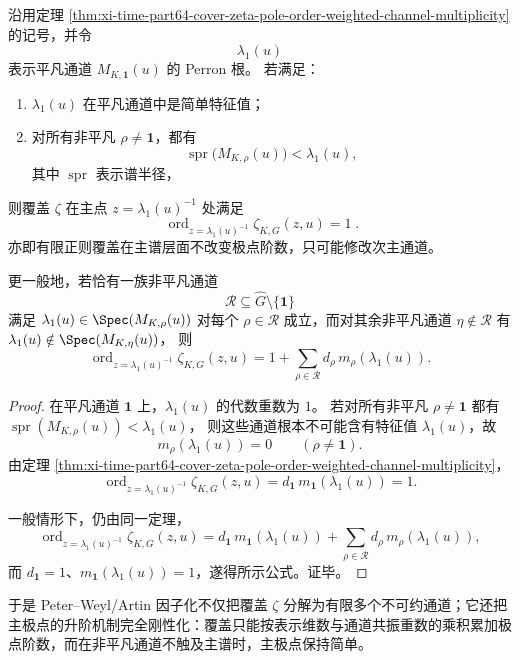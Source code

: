 \begin{corollary}[主极点的覆盖稳定性判据]\label{cor:xi-time-part64-cover-zeta-leading-pole-stability}
沿用定理 \ref{thm:xi-time-part64-cover-zeta-pole-order-weighted-channel-multiplicity} 的记号，并令
\[
\lambda_1(u)
\]
表示平凡通道 \(M_{K,\mathbf 1}(u)\) 的 Perron 根。
若满足：
\begin{enumerate}
  \item \(\lambda_1(u)\) 在平凡通道中是简单特征值；
  \item 对所有非平凡 \(\rho\neq \mathbf 1\)，都有
  \[
  \operatorname{spr}\!\bigl(M_{K,\rho}(u)\bigr)<\lambda_1(u),
  \]
  其中 \(\operatorname{spr}\) 表示谱半径，
\end{enumerate}
则覆盖 \(\zeta\) 在主点 \(z=\lambda_1(u)^{-1}\) 处满足
\[
\boxed{\;
\operatorname{ord}_{z=\lambda_1(u)^{-1}}\zeta_{K,G}(z,u)=1\; }.
\]
亦即有限正则覆盖在主谱层面不改变极点阶数，只可能修改次主通道。

更一般地，若恰有一族非平凡通道
\[
\mathcal R\subseteq \widehat G\setminus\{\mathbf 1\}
\]
满足
\(
\lambda_1(u)\in\Spec(M_{K,\rho}(u))
\)
对每个 \(\rho\in\mathcal R\) 成立，而对其余非平凡通道 \(\eta\notin\mathcal R\) 有
\(
\lambda_1(u)\notin\Spec(M_{K,\eta}(u))
\)，
则
\[
\operatorname{ord}_{z=\lambda_1(u)^{-1}}\zeta_{K,G}(z,u)
=
1+\sum_{\rho\in\mathcal R}d_\rho\,m_\rho(\lambda_1(u)).
\]
\end{corollary}
\begin{proof}
在平凡通道 \(\mathbf 1\) 上，\(\lambda_1(u)\) 的代数重数为 \(1\)。
若对所有非平凡 \(\rho\neq\mathbf 1\) 都有
\(
\operatorname{spr}(M_{K,\rho}(u))<\lambda_1(u)
\)，
则这些通道根本不可能含有特征值 \(\lambda_1(u)\)，故
\[
m_\rho(\lambda_1(u))=0
\qquad(\rho\neq\mathbf 1).
\]
由定理 \ref{thm:xi-time-part64-cover-zeta-pole-order-weighted-channel-multiplicity}，
\[
\operatorname{ord}_{z=\lambda_1(u)^{-1}}\zeta_{K,G}(z,u)
=
d_{\mathbf 1}\,m_{\mathbf 1}(\lambda_1(u))
=1.
\]

一般情形下，仍由同一定理，
\[
\operatorname{ord}_{z=\lambda_1(u)^{-1}}\zeta_{K,G}(z,u)
=
d_{\mathbf 1}\,m_{\mathbf 1}(\lambda_1(u))
+\sum_{\rho\in\mathcal R}d_\rho\,m_\rho(\lambda_1(u)),
\]
而 \(d_{\mathbf 1}=1\)、\(m_{\mathbf 1}(\lambda_1(u))=1\)，遂得所示公式。证毕。
\end{proof}

\noindent
于是 Peter--Weyl/Artin 因子化不仅把覆盖 \(\zeta\) 分解为有限多个不可约通道；它还把主极点的升阶机制完全刚性化：覆盖只能按表示维数与通道共振重数的乘积累加极点阶数，而在非平凡通道不触及主谱时，主极点保持简单。

